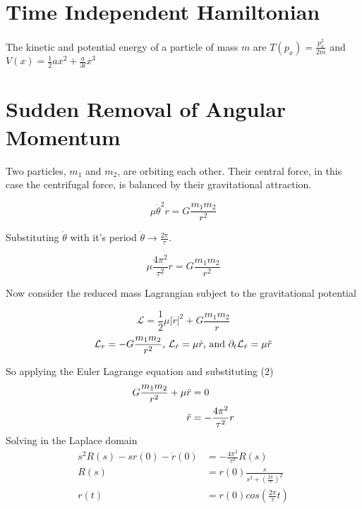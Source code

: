 \section{Time Independent Hamiltonian}
The kinetic and potential energy of a particle of mass $m$ are $T(p_x) = \frac{p_x^2}{2m}$ and $V(x)= \frac{1}{2}ax^2+\frac{a}{3l}x^3$

\section{Sudden Removal of Angular Momentum}
\begin{center}
\end{center}
Two particles, $m_1$ and $m_2$, are orbiting each other. Their central force, in this case the centrifugal force, is balanced by their gravitational attraction.

\begin{equation}
    \mu \dot{\theta}^2 r = G\frac{m_1m_2}{r^2}
\end{equation}

Substituting $\dot{\theta}$ with it's period $\dot{\theta} \rightarrow \frac{2\pi}{\tau}$.

\begin{equation}
    \mu \frac{4\pi^2}{\tau^2}r=G\frac{m_1m_2}{r^2}
\end{equation}

Now consider the reduced mass Lagrangian subject to the gravitational potential

$$
    \mathcal{L} = \frac{1}{2}\mu |\dot{r}|^2 + G\frac{m_1m_2}{r}
$$
$$
    \mathcal{L}_r = -G\frac{m_1m_2}{r^2} \textrm{, } \mathcal{L}_{\dot{r}} = \mu \dot{r} \textrm{, and } \partial_t \mathcal{L}_{\dot{r}} = \mu \Ddot{r}
$$

So applying the Euler Lagrange equation and substituting (2)
\begin{equation}
\begin{split}
        G\frac{m_1m_2}{r^2}+\mu \Ddot{r} &= 0\\
        \Ddot{r} &= -\frac{4\pi^2}{\tau^2}r\\
\end{split}
\end{equation}
Solving in the Laplace domain
\begin{equation}
    \begin{split}
                s^2R(s)-sr(0)-\dot{r}(0) &= -\frac{4\pi^2}{\tau^2}R(s)\\
        R(s) &= r(0) \frac{s}{s^2+(\frac{2\pi}{\tau})^2}\\
        r(t) &= r(0) cos(\frac{2\pi}{\tau}t)
    \end{split}
\end{equation}

